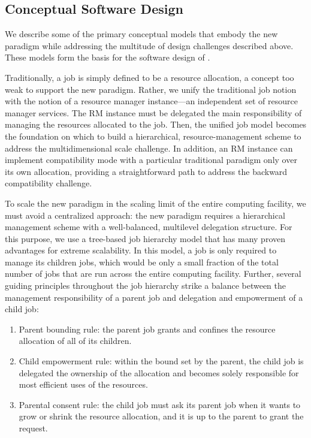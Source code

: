\subsection{Conceptual Software Design}
\label{models}
We describe some of the primary conceptual models that
embody the new paradigm while addressing
the multitude of design challenges described above.
These models form the basis for the software design
of \flux.

\vspace{1ex}
 Traditionally, a job is
simply defined to be a resource allocation, a concept
too weak to support the new paradigm. Rather, we unify
the traditional job notion with the notion of a resource
manager instance---an independent set of resource
manager services. The RM instance must be delegated
the main responsibility of managing the resources allocated
to the job. Then, the unified job model becomes
the foundation on which to build a hierarchical, 
resource-management scheme to address the multidimensional
scale challenge. In addition, an RM instance can
implement compatibility mode with a particular
traditional paradigm only over its own allocation, 
providing a straightforward path to address
the backward compatibility challenge.

\vspace{1ex}
 To scale the new paradigm 
in the scaling limit of the entire computing facility, 
we must avoid a centralized approach: the new paradigm 
requires a hierarchical management scheme with a well-balanced, 
multilevel delegation structure. For this purpose, 
we use a tree-based job hierarchy model that has 
many proven advantages for extreme scalability. 
In this model, a job is only required to manage 
its children jobs, which would be only a small fraction 
of the total number of jobs that are run across 
the entire computing facility. Further, several guiding 
principles throughout the job hierarchy strike 
a balance between the management responsibility 
of a parent job and delegation and empowerment 
of a child job:

\begin{enumerate}
\item{Parent bounding rule: the parent job grants 
and confines the resource allocation of all of its children.}

\item{Child empowerment rule: within the bound set 
by the parent, the child job is delegated the ownership 
of the allocation and becomes solely responsible 
for most efficient uses of the resources.}

\item{Parental consent rule: the child job must ask 
its parent job when it wants to grow or shrink the resource 
allocation, and it is up to the parent to grant the request.}
\end{enumerate}

